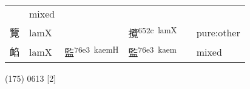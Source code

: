 \documentclass[14pt,a4paper]{scrartcl}
\begin{document}
\begin{longtable}[c]{@{}llllll@{}}
\begin{minipage}[t]{0.14\columnwidth}
\strut\end{minipage} &
\begin{minipage}[t]{0.14\columnwidth}\raggedright\strut
mixed
\strut\end{minipage}\tabularnewline
\begin{minipage}[t]{0.14\columnwidth}\raggedright\strut
覽
\strut\end{minipage} &
\begin{minipage}[t]{0.14\columnwidth}\raggedright\strut
lamX
\strut\end{minipage} &
\begin{minipage}[t]{0.14\columnwidth}\raggedright\strut
\strut\end{minipage} &
\begin{minipage}[t]{0.14\columnwidth}\raggedright\strut
攬\textsuperscript{652c~lamX}
\strut\end{minipage} &
\begin{minipage}[t]{0.14\columnwidth}\raggedright\strut
\strut\end{minipage} &
\begin{minipage}[t]{0.14\columnwidth}\raggedright\strut
pure:other
\strut\end{minipage}\tabularnewline
\begin{minipage}[t]{0.14\columnwidth}\raggedright\strut
䘓
\strut\end{minipage} &
\begin{minipage}[t]{0.14\columnwidth}\raggedright\strut
lamX
\strut\end{minipage} &
\begin{minipage}[t]{0.14\columnwidth}\raggedright\strut
監\textsuperscript{76e3~kaemH}
\strut\end{minipage} &
\begin{minipage}[t]{0.14\columnwidth}\raggedright\strut
監\textsuperscript{76e3~kaem}
\strut\end{minipage} &
\begin{minipage}[t]{0.14\columnwidth}\raggedright\strut
\strut\end{minipage} &
\begin{minipage}[t]{0.14\columnwidth}\raggedright\strut
mixed
\strut\end{minipage}\tabularnewline
\bottomrule
\end{longtable}

(175) 0613 {[}2{]}
\end{document}
